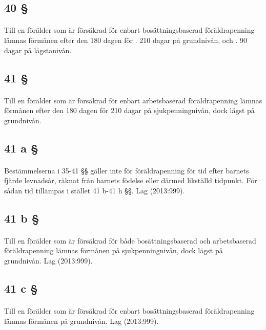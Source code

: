 \documentclass[a4paper,notitlepage,openany,10pt]{book}
\begin{document}
\subsection*{40 §}
\paragraph*{}
Till en förälder som är försäkrad för enbart bosättningsbaserad föräldrapenning lämnas förmånen efter den 180 dagen för
. 210 dagar på grundnivån, och
. 90 dagar på lägstanivån.
\subsection*{41 §}
\paragraph*{}
Till en förälder som är försäkrad för enbart arbetsbaserad föräldrapenning lämnas förmånen efter den 180 dagen för 210 dagar på sjukpenningnivån, dock lägst på grundnivån.
\subsection*{41 a §}
\paragraph*{}
Bestämmelserna i 35-41 §§ gäller inte för föräldrapenning för tid efter barnets fjärde levnadsår, räknat från barnets födelse eller därmed likställd tidpunkt.
För sådan tid tillämpas i stället 41 b-41 h §§.
Lag (2013:999).
\subsection*{41 b §}
\paragraph*{}
Till en förälder som är försäkrad för både bosättningsbaserad och arbetsbaserad föräldrapenning lämnas förmånen på sjukpenningnivån, dock lägst på grundnivån.
Lag (2013:999).
\subsection*{41 c §}
\paragraph*{}
Till en förälder som är försäkrad för enbart bosättningsbaserad föräldrapenning lämnas förmånen på grundnivån.
Lag (2013:999).
\end{document}
